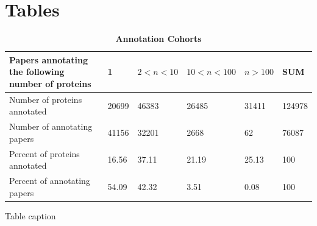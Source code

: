 \documentclass[12pt]{article}
\begin{document}
\section*{Tables}

\begin{table}[!ht]
\caption{
\bf{Annotation Cohorts}}
\begin{tabular}{||p{5cm}||l|l|l|l||l||}
\hline
Papers annotating the following number of proteins & 1 & $2<n<10$ & $10<n<100$ & $n>100$ 
& SUM \\ \hline
Number of proteins annotated & 20699 & 46383 & 26485 & 31411 & 124978 \\ \hline
Number of annotating papers & 41156 & 32201 & 2668 & 62 &  76087 \\ \hline
Percent of proteins annotated & 16.56 & 37.11 & 21.19 & 25.13 & 100 \\ \hline
Percent of annotating papers & 54.09 & 42.32 & 3.51 & 0.08 & 100 \\ \hline 
\end{tabular}
\begin{flushleft}Table caption
\end{flushleft}
\label{tab:cohorts}
\end{table}
\end{document}
